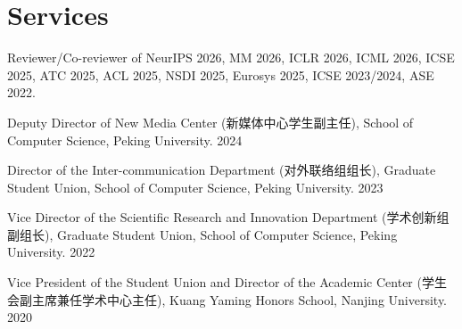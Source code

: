 \section{Services}
\begin{enumerate}[label={[\arabic*]}]
\item Reviewer/Co-reviewer of NeurIPS 2026, MM 2026, ICLR 2026, ICML 2026, ICSE 2025, ATC 2025, ACL 2025, NSDI 2025, Eurosys 2025, ICSE 2023/2024, ASE 2022.
\item Deputy Director of New Media Center (新媒体中心学生副主任), School of Computer Science, Peking University. \hfill 2024 
\item Director of the Inter-communication Department (对外联络组组长), Graduate Student Union, School of Computer Science, Peking University. \hfill 2023
\item Vice Director of the Scientific Research and Innovation Department (学术创新组副组长), Graduate Student Union, School of Computer Science, Peking University. \hfill 2022
\item Vice President of the Student Union and Director of the Academic Center (学生会副主席兼任学术中心主任), Kuang Yaming Honors School, Nanjing University. \hfill 2020
\end{enumerate}